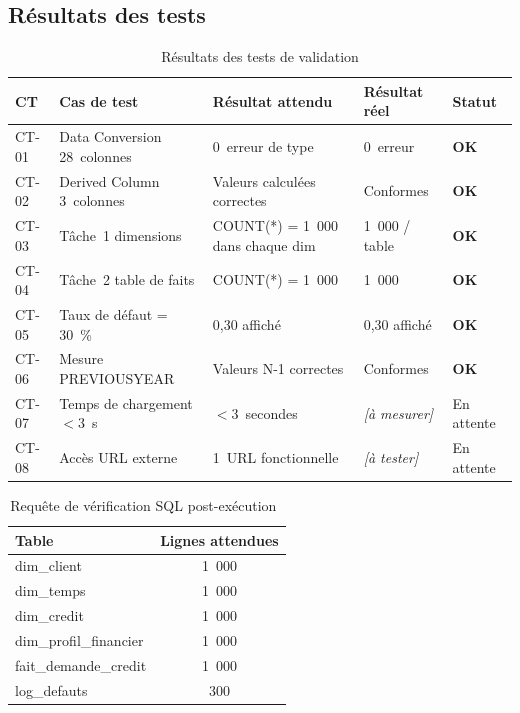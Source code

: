 \documentclass[12pt, a4paper]{report}
\begin{document}
\subsection{Résultats des tests}

\begin{table}[H]
\centering
\caption{Résultats des tests de validation}
\label{tab:resultats_tests}
\renewcommand{\arraystretch}{1.4}
\begin{tabularx}{\textwidth}{p{1.5cm} X p{3cm} p{2cm} p{2cm}}
\toprule
\rowcolor{primary!12}
CT & Cas de test & Résultat attendu & Résultat réel & Statut \\
\midrule
CT-01 & Data Conversion 28~colonnes & 0~erreur de type & 0~erreur & \textcolor{successcolor}{\textbf{OK}} \\
CT-02 & Derived Column 3~colonnes & Valeurs calculées correctes & Conformes & \textcolor{successcolor}{\textbf{OK}} \\
CT-03 & Tâche~1 dimensions & COUNT(*) = 1~000 dans chaque dim & 1~000 / table & \textcolor{successcolor}{\textbf{OK}} \\
CT-04 & Tâche~2 table de faits & COUNT(*) = 1~000 & 1~000 & \textcolor{successcolor}{\textbf{OK}} \\
CT-05 & Taux de défaut = 30~\% & 0,30 affiché & 0,30 affiché & \textcolor{successcolor}{\textbf{OK}} \\
CT-06 & Mesure PREVIOUSYEAR & Valeurs N-1 correctes & Conformes & \textcolor{successcolor}{\textbf{OK}} \\
CT-07 & Temps de chargement $<$3~s & $<$3~secondes & \textit{[à mesurer]} & En attente \\
CT-08 & Accès URL externe & 1~URL fonctionnelle & \textit{[à tester]} & En attente \\
\bottomrule
\end{tabularx}
\end{table}

\begin{table}[H]
\centering
\caption{Requête de vérification SQL post-exécution~\cite{guide_etl}}
\label{tab:sql_verif}
\renewcommand{\arraystretch}{1.3}
\begin{tabular}{lc}
\toprule
\rowcolor{primary!12}
Table & Lignes attendues \\
\midrule
dim\_client & 1~000 \\
dim\_temps & 1~000 \\
dim\_credit & 1~000 \\
dim\_profil\_financier & 1~000 \\
fait\_demande\_credit & 1~000 \\
log\_defauts & 300 \\
\bottomrule
\end{tabular}
\end{table}
\end{document}
